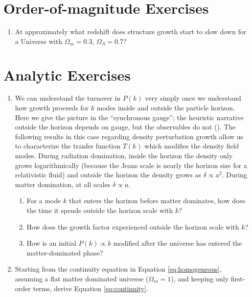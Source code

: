 \section{Order-of-magnitude Exercises}

\begin{enumerate} 
\item At approximately what redshift does structure growth start to
    slow down for a Universe with $\Omega_m = 0.3$, $\Omega_\Lambda = 0.7$?
\end{enumerate} 

\section{Analytic Exercises}

\begin{enumerate}
\item We can understand the turnover in $P(k)$ very simply once we
understand how growth proceeds for $k$ modes inside and outside the
particle horizon. Here we give the picture in the ``synchronous
gauge''; the heuristic narrative outside the horizon depends on gauge,
but the observables do not (\citealt{ma95a}). The following results in
this case regarding density perturbation growth allow us to
characterize the tranfer function $T(k)$ which modifies the density
field modes.  During radiation domination, inside the horizon the
density only grows logarithmically (because the Jeans scale is nearly
the horizon size for a relativistic fluid) and outside the horizon the
density grows as $\delta\propto a^2$. During matter domination, at all
scales $\delta\propto a$.
\begin{enumerate}
\item For a mode $k$ that enters the horizon before matter dominates,
how does the time it spends outside the horizon scale with $k$? 
\item How does the growth factor experienced outside the horizon scale
with $k$?
\item How is an initial $P(k) \propto k$ modified after the universe
has entered the matter-dominated phase?
\end{enumerate}
\item Starting from the continuity equation in Equation
   \ref{eq:homogeneous}, assuming a flat matter dominated universe
    ($\Omega_m = 1$), and keeping only first-order terms, derive
    Equation \ref{eq:continuity}.

%



\end{enumerate}
